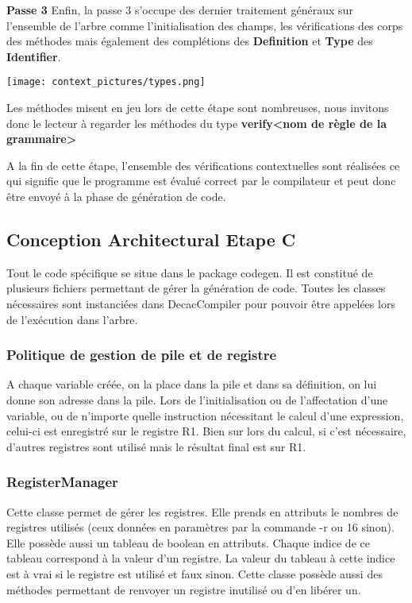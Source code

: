 \documentclass[12pt, a4paper, one side]{article}
\begin{document}
    \textbf{Passe 3}
    Enfin, la passe 3 s'occupe des dernier traitement généraux sur l'ensemble de
    l'arbre comme l'initialisation des champs, les vérifications des corps des
    méthodes mais également des complétions des \textbf{Definition} et
    \textbf{Type} des \textbf{Identifier}.

    \texttt{[image: context\_pictures/types.png]}

    Les méthodes misent en jeu lors de cette étape sont nombreuses, nous
    invitons donc le lecteur à regarder les méthodes du type \textbf{verify<nom
    de règle de la grammaire>}

    A la fin de cette étape, l'ensemble des vérifications contextuelles sont
    réalisées ce qui signifie que le programme est évalué correct par le
    compilateur et peut donc être envoyé à la phase de génération de code.



    \subsection{Conception Architectural Etape C}

    Tout le code spécifique se situe dans le package codegen. Il est constitué
    de plusieurs fichiers
    permettant de gérer la génération de code. Toutes les classes nécessaires
    sont instanciées dans DecacCompiler
    pour pouvoir être appelées lors de l'exécution  dans l'arbre.

    \subsubsection{Politique de gestion de pile et de registre}

    A chaque variable créée, on la place dans la pile et dans sa définition, on
    lui donne son adresse dans la pile.
    Lors de l'initialisation ou de l'affectation d'une variable, ou de n'importe
    quelle instruction nécessitant le
    calcul d'une expression, celui-ci est enregistré sur le registre R1. Bien
    sur lors du calcul, si c'est nécessaire,
    d'autres registres sont utilisé mais le résultat final est sur R1.

    \subsubsection{RegisterManager}

    Cette classe permet de gérer les registres. Elle prends en attributs le
    nombres de registres utilisés
    (ceux données en paramètres par la commande -r ou 16 sinon). Elle possède
    aussi un tableau de boolean
    en attributs. Chaque indice de ce tableau correspond à la valeur d'un
    registre. La valeur du tableau
    à cette indice est à vrai si le registre est utilisé et faux sinon. Cette
    classe possède aussi des
    méthodes permettant de renvoyer un registre inutilisé ou d'en libérer un.
\end{document}
